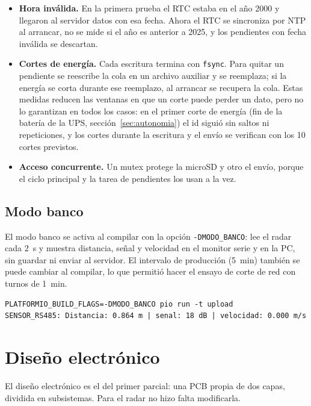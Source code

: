 \documentclass[11pt,a4paper]{article}
\newcommand{\seccion}[1]{\needspace{10\baselineskip}\section{#1}}
\begin{document}
\begin{itemize}
    \item \textbf{Hora inválida.} En la primera prueba el RTC estaba en el año
        2000 y llegaron al servidor datos con esa fecha. Ahora el RTC se
        sincroniza por NTP al arrancar, no se mide si el año es anterior a
        2025, y los pendientes con fecha inválida se descartan.
    \item \textbf{Cortes de energía.} Cada escritura termina con
        \texttt{fsync}. Para quitar un pendiente se reescribe la cola en un
        archivo auxiliar y se reemplaza; si la energía se corta durante ese
        reemplazo, al arrancar se recupera la cola. Estas medidas reducen las
        ventanas en que un corte puede perder un dato, pero no lo garantizan
        en todos los casos: en el primer corte de energía (fin de la batería
        de la UPS, sección~\ref{sec:autonomia}) el id siguió sin saltos ni
        repeticiones, y los cortes durante la escritura y el envío se
        verifican con los 10 cortes previstos.
    \item \textbf{Acceso concurrente.} Un mutex protege la microSD y otro el
        envío, porque el ciclo principal y la tarea de pendientes los usan a
        la vez.
\end{itemize}

\subsection{Modo banco}

El modo banco se activa al compilar con la opción
\texttt{-DMODO\_BANCO}: lee el radar cada 2~s y muestra distancia, señal y
velocidad en el monitor serie y en la PC, sin guardar ni enviar al servidor. El intervalo de
producción (5~min) también se puede cambiar al compilar, lo que permitió hacer
el ensayo de corte de red con turnos de 1~min.

\begin{verbatim}
PLATFORMIO_BUILD_FLAGS=-DMODO_BANCO pio run -t upload
SENSOR_RS485: Distancia: 0.864 m | senal: 18 dB | velocidad: 0.000 m/s
\end{verbatim}

\seccion{Diseño electrónico}

El diseño electrónico es el del primer parcial: una PCB propia de dos capas,
dividida en subsistemas. Para el radar no hizo falta modificarla.
\end{document}
